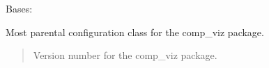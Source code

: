 \documentclass[letterpaper,10pt,english]{sphinxmanual}
\begin{document}
\begin{fulllineitems}
\label{\detokenize{comp_viz:comp_viz.config.CompViz}}
\pysigstartsignatures
{}
\pysigstopsignatures
\sphinxAtStartPar
Bases: 

\sphinxAtStartPar
Most parental configuration class for the comp\_viz package.
\begin{quote}\begin{description}
\sphinxAtStartPar
{} \textendash{} Version number for the comp\_viz package.

\end{description}\end{quote}

\begin{fulllineitems}
\label{\detokenize{comp_viz:comp_viz.config.CompViz.version}}
\pysigstartsignatures
{}
\pysigstopsignatures
\end{fulllineitems}


\end{fulllineitems}

\end{document}
